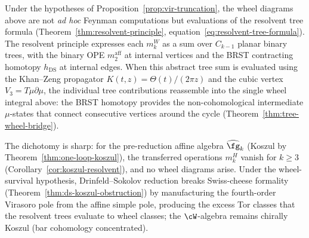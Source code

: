 \begin{remark}
Under the hypotheses of Proposition~\ref{prop:vir-truncation}, the
wheel diagrams above are not \emph{ad hoc} Feynman computations but
evaluations of the resolvent tree formula
(Theorem~\ref{thm:resolvent-principle},
equation~\eqref{eq:resolvent-tree-formula}). The resolvent
principle expresses each $m_k^W$ as a sum over $C_{k-1}$
planar binary trees, with the binary OPE $m_2^{\mathrm{aff}}$
at internal vertices and the BRST contracting homotopy
$h_{\mathrm{DS}}$ at internal edges. When this abstract tree
sum is evaluated using the Khan--Zeng propagator
$K(t,z) = \Theta(t)/(2\pi z)$ and the cubic vertex
$V_3 = T\mu\partial\mu$, the individual tree contributions
reassemble into the single wheel integral above:
the BRST homotopy provides the non-cohomological intermediate
$\mu$-states that connect consecutive vertices around the
cycle (Theorem~\ref{thm:tree-wheel-bridge}).

The dichotomy is sharp: for the pre-reduction affine
algebra $\widehat{\fg}_k$ (Koszul by
Theorem~\ref{thm:one-loop-koszul}), the transferred operations $m_k^H$
vanish for $k \geq 3$
(Corollary~\ref{cor:koszul-resolvent}), and no wheel diagrams
arise. Under the wheel-survival hypothesis, Drinfeld--Sokolov
reduction breaks Swiss-cheese formality
(Theorem~\ref{thm:ds-koszul-obstruction}) by manufacturing
the fourth-order Virasoro pole from the affine simple pole,
producing the excess Tor classes that the resolvent trees
evaluate to wheel classes; the $\cW$-algebra remains
chirally Koszul (bar cohomology concentrated).
\end{remark}

